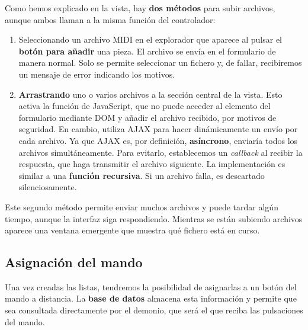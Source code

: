 \smallskip

Como hemos explicado en la vista, hay \textbf{dos métodos} para subir archivos, aunque ambos llaman a la misma función del controlador:

\begin{enumerate}
	\item Seleccionando un archivo \acrshort{MIDI} en el explorador que aparece al pulsar el\textbf{ botón para añadir} una pieza. El archivo se envía en el formulario de manera normal. Solo se permite seleccionar un fichero y, de fallar, recibiremos un mensaje de error indicando los motivos.
	
	\item \textbf{Arrastrando} uno o varios archivos a la sección central de la vista. Esto activa la función  de JavaScript, que no puede acceder al elemento  del formulario mediante \acrshort{DOM} y añadir el archivo recibido, por motivos de seguridad. En cambio, utiliza \acrshort{AJAX} para hacer dinámicamente un envío por cada archivo. Ya que \acrshort{AJAX} es, por definición, \textbf{asíncrono}, enviaría todos los archivos simultáneamente. Para evitarlo, establecemos un \textit{callback} al recibir la respuesta, que haga transmitir el archivo siguiente. La implementación es similar a una \textbf{función recursiva}. Si un archivo falla, es descartado silenciosamente.
\end{enumerate}

Este segundo método permite enviar muchos archivos y puede tardar algún tiempo, aunque la interfaz siga respondiendo. Mientras se están subiendo archivos aparece una ventana emergente que muestra qué fichero está en curso.

\subsection{Asignación del mando}

Una vez creadas las listas, tendremos la posibilidad de asignarlas a un botón del mando a distancia. La \textbf{base de datos} almacena esta información y permite que sea consultada directamente por el demonio, que será el que reciba las pulsaciones del mando.

\smallskip

